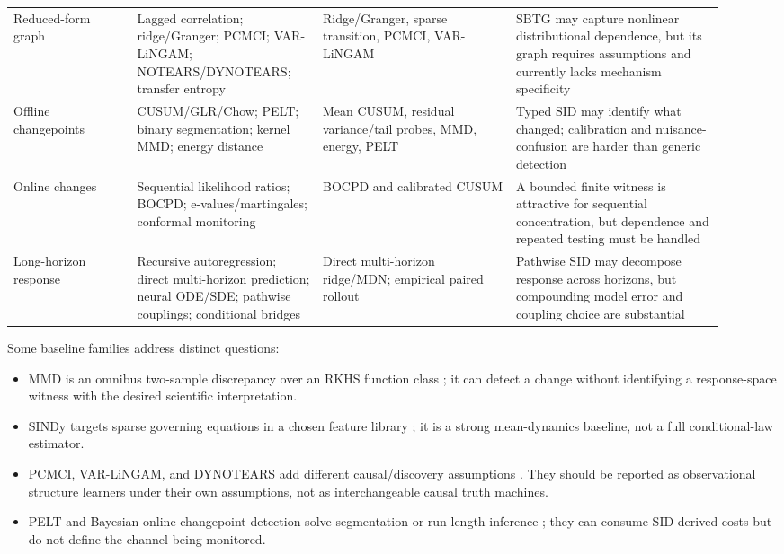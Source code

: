 \documentclass[10pt]{article}
\begin{document}
\begin{longtable}{@{}p{0.16\linewidth}p{0.24\linewidth}p{0.25\linewidth}p{0.27\linewidth}@{}}
Reduced-form graph & Lagged correlation; ridge/Granger; PCMCI; VAR-LiNGAM; NOTEARS/DYNOTEARS; transfer entropy & Ridge/Granger, sparse transition, PCMCI, VAR-LiNGAM & SBTG may capture nonlinear distributional dependence, but its graph requires assumptions and currently lacks mechanism specificity \\
Offline changepoints & CUSUM/GLR/Chow; PELT; binary segmentation; kernel MMD; energy distance & Mean CUSUM, residual variance/tail probes, MMD, energy, PELT & Typed SID may identify what changed; calibration and nuisance-confusion are harder than generic detection \\
Online changes & Sequential likelihood ratios; BOCPD; e-values/martingales; conformal monitoring & BOCPD and calibrated CUSUM & A bounded finite witness is attractive for sequential concentration, but dependence and repeated testing must be handled \\
Long-horizon response & Recursive autoregression; direct multi-horizon prediction; neural ODE/SDE; pathwise couplings; conditional bridges & Direct multi-horizon ridge/MDN; empirical paired rollout & Pathwise SID may decompose response across horizons, but compounding model error and coupling choice are substantial \\
\bottomrule
\end{longtable}

Some baseline families address distinct questions:

\begin{itemize}
  \item MMD is an omnibus two-sample discrepancy over an RKHS function class \cite{gretton2012}; it can detect a change without identifying a response-space witness with the desired scientific interpretation.
  \item SINDy targets sparse governing equations in a chosen feature library \cite{brunton2016}; it is a strong mean-dynamics baseline, not a full conditional-law estimator.
  \item PCMCI, VAR-LiNGAM, and DYNOTEARS add different causal/discovery assumptions \cite{runge2019,hyvarinen2010,pamfil2020}. They should be reported as observational structure learners under their own assumptions, not as interchangeable causal truth machines.
  \item PELT and Bayesian online changepoint detection solve segmentation or run-length inference \cite{killick2012,adams2007}; they can consume SID-derived costs but do not define the channel being monitored.
\end{itemize}
\end{document}
